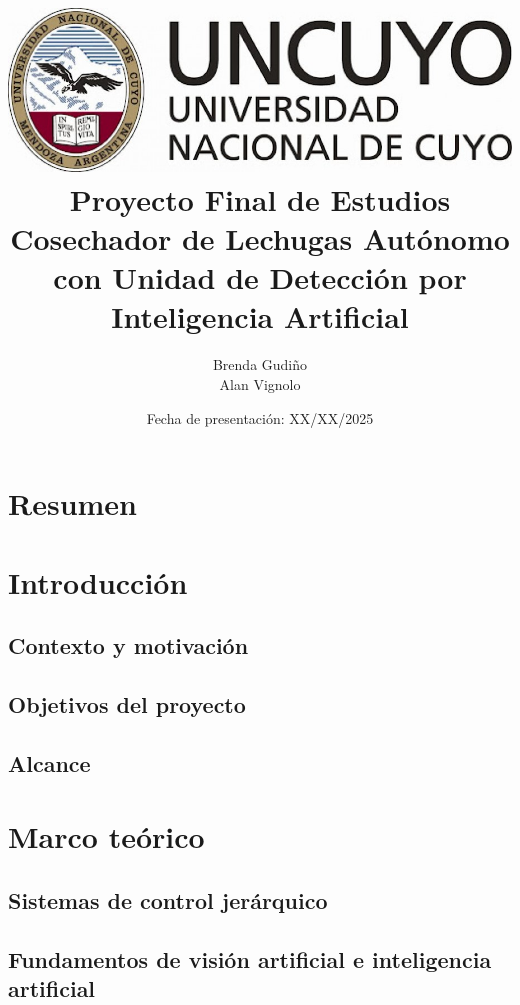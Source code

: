 \documentclass[a4paper,12pt]{report}
\title{
\includegraphics[scale = 0.3]{logo_uncuyo.png} \\ [2cm]
{\Huge \textbf{Proyecto Final de Estudios} \\ [1cm] 
Cosechador de Lechugas Autónomo con Unidad de Detección por Inteligencia Artificial}}
\author{Brenda Gudiño \\ Alan Vignolo}
\date{{Fecha de presentación: XX/XX/2025}}
\begin{document}

\maketitle
\tableofcontents 
\newpage

\chapter*{Resumen}


\chapter{Introducción}

\section{Contexto y motivación}

\newpage
\section{Objetivos del proyecto}


\section{Alcance}


\chapter{Marco teórico}

\section{Sistemas de control jerárquico}


\section{Fundamentos de visión artificial e inteligencia artificial}





\end{document}
